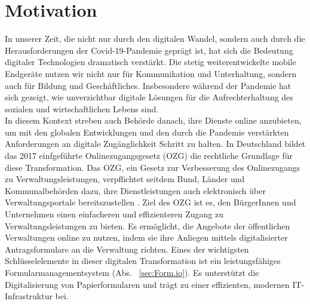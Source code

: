 \section{Motivation}
\label{sec:motivation}


In unserer Zeit, die nicht nur durch den digitalen Wandel, sondern auch durch die Herausforderungen der Covid-19-Pandemie geprägt ist, hat sich die Bedeutung digitaler Technologien dramatisch verstärkt. Die stetig weiterentwickelte mobile Endgeräte nutzen wir nicht nur für Kommunikation und Unterhaltung, sondern auch für Bildung und Geschäftliches. Insbesondere während der Pandemie hat sich gezeigt, wie unverzichtbar digitale Lösungen für die Aufrechterhaltung des sozialen und wirtschaftlichen Lebens sind.\\

In diesem Kontext streben auch Behörde danach, ihre Dienste online anzubieten, um mit den globalen Entwicklungen und den durch die Pandemie verstärkten Anforderungen an digitale Zugänglichkeit Schritt zu halten. In Deutschland bildet das 2017 einfgeführte Onlinezugangsgesetz (OZG) die rechtliche Grundlage für diese Transformation. Das OZG, ein Gesetz zur Verbesserung des Onlinezugangs zu Verwaltungsleistungen, verpflichtet seitdem Bund, Länder und Kommunalbehörden dazu, ihre Dienstleistungen auch elektronisch über Verwaltungsportale bereitszustellen \citep{bundesministerium_des_innern_und_fur_heimat_onlinezugangsgesetz_2017}. Ziel des OZG ist es, den BürgerInnen und Unternehmen einen einfacheren und effizienteren Zugang zu Verwaltungsleistungen zu bieten. Es ermöglicht, die Angebote der öffentlichen Verwaltungen online zu nutzen, indem sie ihre Anliegen mittels digitalisierter Antragsformulare an die Verwaltung richten. Eines der wichtigsten Schlüsselelemente in dieser digitalen Transformation ist ein leistungsfähiges Formularmanagementsystem (Abs. ~\ref{sec:Form.io}). Es unterstützt die Digitalisierung von Papierformularen und trägt zu einer effizienten, modernen IT-Infrastruktur bei.\\

